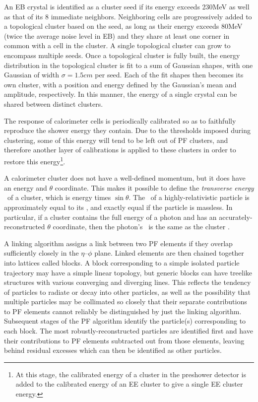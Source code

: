 An EB crystal is identified as a cluster seed if its energy exceeds 230\unit{MeV} as well as that of its 8 immediate neighbors. Neighboring cells
are progressively added to a topological cluster based on the seed, as long as their energy exceeds 80\unit{MeV} (twice the average noise level in EB)
and they share at least one corner in common with a cell in the cluster. A single topological cluster can grow to encompass multiple seeds.
Once a topological cluster is fully built, the energy distribution in the topological cluster is fit to a sum of Gaussian shapes,
with one Gaussian of width $\sigma = 1.5\unit{cm}$ per seed. Each of the fit shapes then becomes its own cluster, with a position and energy defined by the Gaussian's
mean and amplitude, respectively. In this manner, the energy of a single crystal can be shared between distinct clusters.

The response of calorimeter cells is periodically calibrated so as to faithfully reproduce the shower energy they contain.
Due to the thresholds imposed during clustering, some of this energy will tend to be left out of PF clusters, and therefore another
layer of calibrations is applied to these clusters in order to restore this energy\footnote{At this stage, the calibrated energy of a cluster in the preshower detector
is added to the calibrated energy of an EE cluster to give a single EE cluster energy.}.

A calorimeter cluster does not have a well-defined momentum, but it does have an energy and $\theta$ coordinate. This makes it possible to define the \textit{transverse
energy} \ET\ of a cluster, which is energy times $\sin{\theta}$.
The \ET\ of a highly-relativistic particle is approximately equal to its \pT, and exactly equal if the particle is massless. In particular, if a cluster contains the
full energy of a photon and has an accurately-reconstructed $\theta$ coordinate, then the photon's \pT\ is the same as the cluster \ET.

A linking algorithm assigns a link between two PF elements if they overlap sufficiently closely in the $\eta$--$\phi$ plane.
Linked elements are then chained together into lattices called blocks. A block corresponding to a simple isolated particle trajectory
may have a simple linear topology, but generic blocks can have treelike structures with various converging and diverging lines.
This reflects the tendency of particles to radiate or decay into other
particles, as well as the possibility that multiple particles may be collimated so closely that their separate contributions to PF elements cannot
reliably be distinguished by just the linking algorithm. Subsequent stages of the PF algorithm identify the particle(s) corresponding to each
block. The most robustly-reconstructed particles are identified first and have their contributions to PF elements
subtracted out from those elements, leaving behind residual excesses which can then be identified as other particles.

